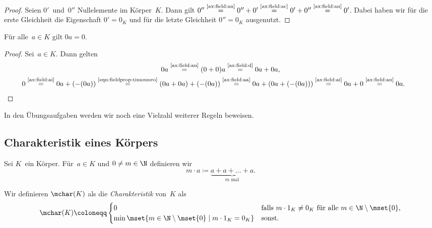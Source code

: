 \documentclass[a4paper]{article}
\begin{document}
\begin{proof}
    Seien $0'$~und~$0''$ Nullelemente im Körper~$K$. Dann gilt $0'' \overset{\text{\ref{ax:field:an}}}{=} 0''+0' \overset{\text{\ref{ax:field:ac}}}{=} 0'+0'' \overset{\text{\ref{ax:field:an}}}{=} 0'$. Dabei haben wir für die erste Gleichheit die Eigenschaft $0' = 0_K$ und für die letzte Gleichheit $0'' = 0_K$ ausgenutzt.
\end{proof}

\begin{lemma}
    Für alle~$a \in K$ gilt $0a = 0$.
\end{lemma}

\begin{proof}
    Sei~$a \in K$. Dann gelten
    \begin{gather}
        0a \overset{\text{\ref{ax:field:an}}}{=} (0+0)a \overset{\text{\ref{ax:field:d}}}{=} 0a + 0a, \label{eqn:fieldprop:timeszero}\\
        0 \overset{\text{\ref{ax:field:ai}}}{=} 0a + (-(0a)) \overset{\text{\eqref{eqn:fieldprop:timeszero}}}{=} (0a + 0a) + (-(0a)) \overset{\text{\ref{ax:field:aa}}}{=} 0a + (0a + (-(0a))) \overset{\text{\ref{ax:field:ai}}}{=} 0a + 0 \overset{\text{\ref{ax:field:an}}}{=} 0a. \tag*{\qedhere}
    \end{gather}
\end{proof}

In den Übungsaufgaben werden wir noch eine Vielzahl weiterer Regeln beweisen.

\subsection{Charakteristik eines Körpers}

\begin{notation}
    Sei $K$~ein Körper. Für~$a \in K$ und $0 \neq m \in \N$ definieren wir
    \begin{equation*}
        m \cdot a \coloneqq \underbrace{a + a + \dots + a }_\text{$m$ mal}.
    \end{equation*}
\end{notation}

\begin{definition}[Charakteristik]
    Wir definieren $\mchar(K)$ als die \emph{Charakteristik} von~$K$ als
    \begin{equation*}
        \mchar(K) \coloneqq \begin{cases}
            0                                                             & \text{falls $m \cdot 1_K \neq 0_K$ für alle $m \in \N \setminus \mset{0}$}, \\
            \min\mset{m \in \N \setminus \mset{0} \mid m \cdot 1_K = 0_K} & \text{sonst}.
        \end{cases}
    \end{equation*}
\end{definition}
\end{document}
